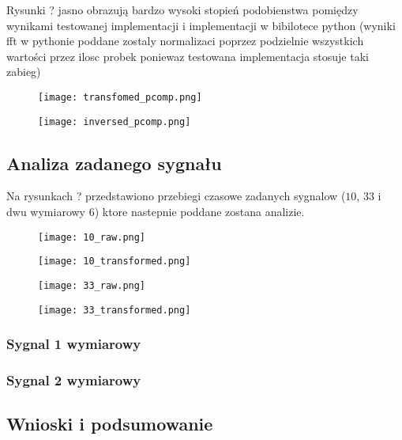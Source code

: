 \documentclass{artikel3}
\begin{document}

Rysunki ? jasno obrazują bardzo wysoki stopień podobienstwa pomiędzy wynikami testowanej implementacji i implementacji w bibilotece python (wyniki fft w pythonie poddane zostaly normalizaci poprzez podzielnie wszystkich wartości przez ilosc probek poniewaz testowana implementacja stosuje taki zabieg)

\begin{figure}[H]
    \centering
    \texttt{[image: transfomed\_pcomp.png]}
\end{figure}
    


\begin{figure}[H]
    \centering
    \texttt{[image: inversed\_pcomp.png]}
\end{figure}
    


\subsection{Analiza zadanego sygnału}

Na rysunkach ? przedstawiono przebiegi czasowe zadanych sygnalow ($10$, $33$ i dwu wymiarowy $6$) ktore nastepnie poddane zostana analizie.

\begin{figure}[H]
    \centering
    \texttt{[image: 10\_raw.png]}
\end{figure}

\begin{figure}[H]
    \centering
    \texttt{[image: 10\_transformed.png]}
\end{figure}


\begin{figure}[H]
    \centering
    \texttt{[image: 33\_raw.png]}
\end{figure}
\begin{figure}[H]
    \centering
    \texttt{[image: 33\_transformed.png]}
\end{figure}



\subsubsection{Sygnal 1 wymiarowy}

\subsubsection{Sygnal 2 wymiarowy}

\subsection{Wnioski i podsumowanie}

\pagebreak

\printbibliography
\end{document}
